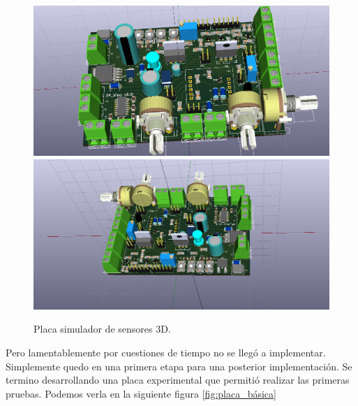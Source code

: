 \begin{figure}[h]
      \centering
      \includegraphics[scale=0.3]{./Figures/pcb_3d.png}
      \includegraphics[scale=0.3]{./Figures/pcb_3d_back.png}
      \caption{Placa simulador de sensores 3D.}
      \label{fig:pcb3d}
\end{figure}

Pero lamentablemente por cuestiones de tiempo no se llegó a implementar. Simplemente quedo en una primera etapa para una posterior implementación. Se termino desarrollando una placa experimental que permitió realizar las primeras pruebas. Podemos verla en la siguiente figura \ref{fig:placa_básica}

